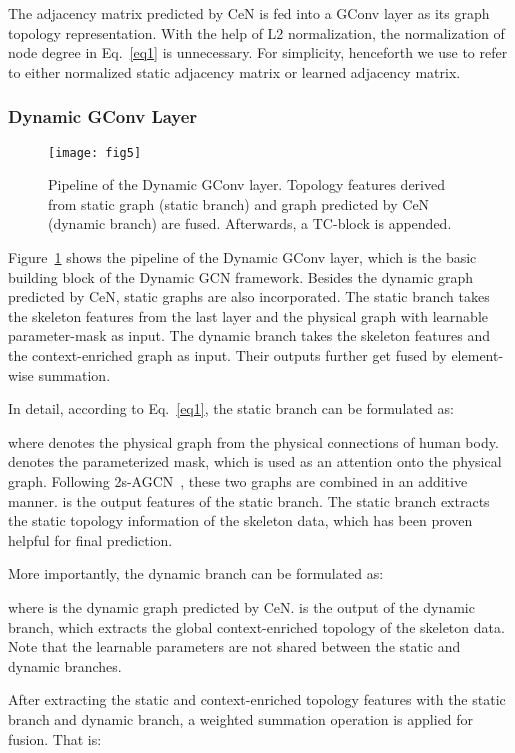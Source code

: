 \documentclass[sigconf]{acmart}
\begin{document}
The adjacency matrix predicted by CeN is fed into a GConv layer as its graph topology representation. With the help of L2 normalization, the normalization of node degree in Eq.~\eqref{eq1} is unnecessary. For simplicity, henceforth we use  to refer to either normalized static adjacency matrix or learned adjacency matrix.

\subsubsection{Dynamic GConv Layer}
\begin{figure}[t]
\centering
\texttt{[image: fig5]} \caption{Pipeline of the Dynamic GConv layer. Topology features derived from static graph (static branch) and graph predicted by CeN (dynamic branch) are fused. Afterwards, a TC-block is appended.}
\label{fig4}
\end{figure}

Figure~\ref{fig4} shows the pipeline of the Dynamic GConv layer, which is the basic building block of the Dynamic GCN framework. Besides the dynamic graph predicted by CeN, static graphs are also incorporated. The static branch takes the skeleton features from the last layer and the physical graph  with learnable parameter-mask  as input. The dynamic branch takes the skeleton features and the context-enriched graph  as input. Their outputs further get fused by element-wise summation.


In detail, according to Eq.~\eqref{eq1}, the static branch can be formulated as:
 
where  denotes the physical graph from the physical connections of human body.  denotes the parameterized mask, which is used as an attention onto the physical graph. Following 2s-AGCN~\cite{shi2019two}, these two graphs are combined in an additive manner.  is the output features of the static branch. The static branch extracts the static topology information of the skeleton data, which has been proven helpful for final prediction.

More importantly, the dynamic branch can be formulated as:

where  is the dynamic graph predicted by CeN.  is the output of the dynamic branch, which extracts the global context-enriched topology of the skeleton data. Note that the learnable parameters  are not shared between the static and dynamic branches.

After extracting the static and context-enriched topology features with the static branch and dynamic branch, a weighted summation operation is applied for fusion. That is:
\end{document}
